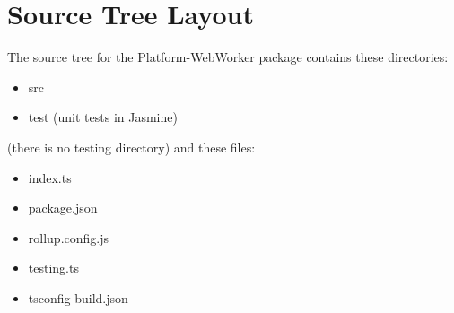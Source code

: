 \section{Source Tree Layout}

The source tree for the Platform-WebWorker package contains these directories:

\begin{itemize}
  \item src
  \item test (unit tests in Jasmine)
\end{itemize}

(there is no testing directory) and these files:

\begin{itemize}
  \item index.ts
  \item package.json
  \item rollup.config.js
  \item testing.ts
  \item tsconfig-build.json
\end{itemize}
